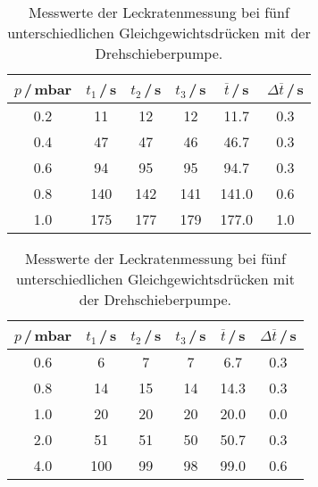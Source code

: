 \begin{table}[H]
  \caption{Messwerte der Leckratenmessung bei fünf unterschiedlichen Gleichgewichtsdrücken mit der Drehschieberpumpe.}
  \begin{subtable}{0.45\textwidth}
    \hspace{-1.2cm}
    \begin{tabular}{c|c|c|c|c|c}\label{tab:Leck0.1Dreh}
      $p$\,/\,mbar & $t_1$\,/\,s & $t_2$\,/\,s & $t_3$\,/\,s & $\overline{t}$\,/\,s & $\Delta \overline{t}$\,/\,s \\
      \midrule
      0.2 & 11  & 12  & 12  & 11.7  & 0.3 \\
      0.4 & 47  & 47  & 46  & 46.7  & 0.3 \\
      0.6 & 94  & 95  & 95  & 94.7  & 0.3 \\
      0.8 & 140 & 142 & 141 & 141.0 & 0.6 \\
      1.0 & 175 & 177 & 179 & 177.0 & 1.0 \\
    \end{tabular}
  \end{subtable}\hfill
  \begin{subtable}{0.45\textwidth}
    \hspace{-0.5cm}
    \begin{tabular}{c|c|c|c|c|c}\label{tab:Leck0.4Dreh}
      $p$\,/\,mbar & $t_1$\,/\,s & $t_2$\,/\,s & $t_3$\,/\,s & $\overline{t}$\,/\,s & $\Delta \overline{t}$\,/\,s \\
      \midrule
      0.6 & 6   & 7  & 7  & 6.7  & 0.3 \\
      0.8 & 14  & 15 & 14 & 14.3 & 0.3 \\
      1.0 & 20  & 20 & 20 & 20.0 & 0.0 \\
      2.0 & 51  & 51 & 50 & 50.7 & 0.3 \\
      4.0 & 100 & 99 & 98 & 99.0 & 0.6 \\
    \end{tabular}
  \end{subtable}

  \vspace{1cm}


\end{table}
